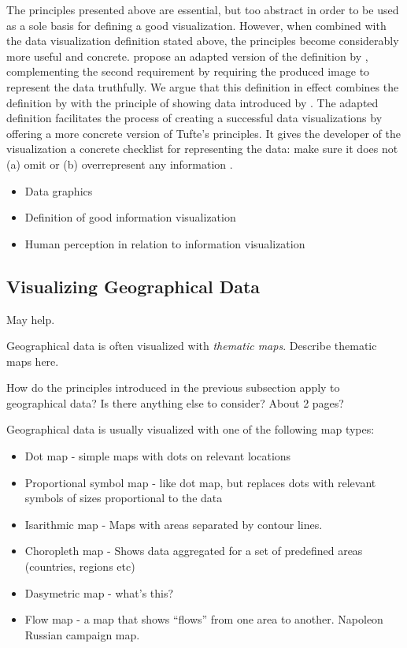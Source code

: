 The principles presented above are essential, but too abstract in order to be used as a sole basis for defining a good visualization. However, when combined with the data visualization definition stated above, the principles become considerably more useful and concrete. \citet{azzam_j-b_2013} propose an adapted version of the definition by \citet{kosara_visualization_2007}, complementing the second requirement by requiring the produced image to represent the data truthfully. We argue that this definition in effect combines the definition by \citet{kosara_visualization_2007} with the principle of showing data introduced by \citet{tufte_visual_1986}. The adapted definition facilitates the process of creating a successful data visualizations by offering a more concrete version of Tufte's principles. It gives the developer of the visualization a concrete checklist for representing the data: make sure it does not (a) omit or (b)  overrepresent any information \citep{azzam_j-b_2013}.



\begin{itemize}
\item Data graphics
\item Definition of good information visualization
\item Human perception in relation to information visualization
\end{itemize}

\subsection{Visualizing Geographical Data}

\citet[p.~16]{tufte_visual_1986} May help.

Geographical data is often visualized with \emph{thematic maps}. Describe thematic maps here.

How do the principles introduced in the previous subsection apply to geographical data? Is there anything else to consider? About 2 pages?

Geographical data is usually visualized with one of the following map types:
\begin{itemize}
  \item Dot map - simple maps with dots on relevant locations
  \item Proportional symbol map - like dot map, but replaces dots with relevant symbols of sizes proportional to the data
  \item Isarithmic map - Maps with areas separated by contour lines.
  \item Choropleth map - Shows data aggregated for a set of predefined areas (countries, regions etc)
  \item Dasymetric map - what's this?
  \item Flow map - a map that shows ``flows'' from one area to another. Napoleon Russian campaign map.
\end{itemize}

